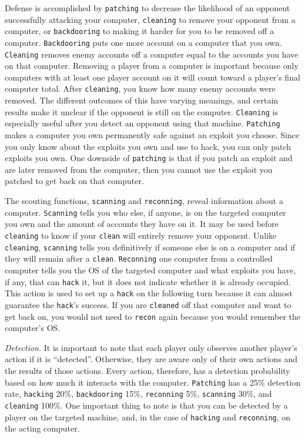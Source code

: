 Defense is accomplished by {\tt patching} to decrease the likelihood of an opponent successfully attacking your computer, {\tt cleaning} to remove your opponent from a computer, or {\tt backdooring} to making it harder for you to be removed off a computer. 
{\tt Backdooring} puts one more account on a computer that you own. 
{\tt Cleaning} removes enemy accounts off a computer equal to the accounts you have on that computer.  Removing a player from a computer is important because only computers with at least one player account on it will count toward a player's final computer total. After {\tt cleaning}, you know how many enemy accounts were removed.  The different outcomes of this have varying meanings, and certain results make it unclear if the opponent is still on the computer. {\tt Cleaning} is especially useful after you detect an opponent using that machine.
 {\tt Patching} makes a computer you own permanently safe against an exploit you choose. Since you only know about the exploits you own and use to hack, you can only patch exploits you own. 
One downside of {\tt patching} is that if you patch an exploit and are later removed from the computer, then you cannot use the exploit you patched to get back on that computer. 

The scouting functions, {\tt scanning} and {\tt reconning}, reveal information about a computer. {\tt Scanning} tells you who else, if anyone, is on the targeted computer you own and the amount of accounts they have on it.  It may be used before {\tt cleaning} to know if your {\tt clean} will entirely remove your opponent. Unlike {\tt cleaning}, {\tt scanning} tells you definitively if someone else is on a computer and if they will remain after a {\tt clean}.  {\tt Reconning} one computer from a controlled computer tells you the OS of the targeted computer and what exploits you have, if any, that can {\tt hack} it, but it does not indicate whether it is already occupied. This action is used to set up a {\tt hack} on the following turn because it can almost guarantee the {\tt hack}'s success.  If you are {\tt cleaned} off that computer and want to get back on, you would not need to {\tt recon} again because you would remember the computer's OS.

{\em Detection.}
It is important to note that each player only observes another player's action if it is ``detected''. Otherwise, they are aware only of their own actions and the results of those actions. Every action, therefore, has a detection probability based on how much it interacts with the computer.  {\tt Patching} has a 25\% detection rate, {\tt hacking} 20\%, {\tt backdooring} 15\%, {\tt reconning} 5\%, {\tt scanning} 30\%, and {\tt cleaning} 100\%. One important thing to note is that you can be detected by a player on the targeted machine, and, in the case of {\tt hacking} and {\tt reconning}, on the acting computer. 


